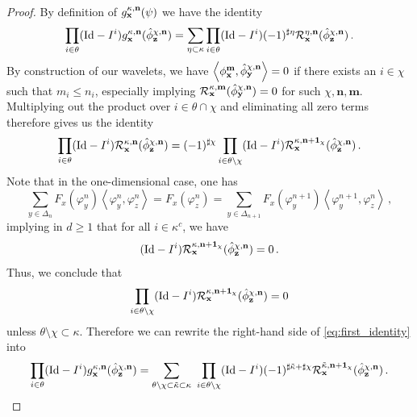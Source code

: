 \documentclass[12pt]{article}
\numberwithin{equation}{section}
\theoremstyle{plain}
\theoremstyle{definition}
\newcommand{\scalar}[1]{\left\langle #1 \right\rangle}
\newcommand{\Id}{\mbox{Id}}
\def\fm{\mathbf m}\def\fn{\mathbf n}\def\fN{\mathbf N}
\def\fy{\mathbf y}\def\fz{\mathbf z}
\def\fone{{\boldsymbol 1}}
\begin{document}
\begin{proof}
By definition of  $ g^{\kappa,\fn}_\fx(\psi) $ we have the identity
\begin{equation}\label{eq:first_identity}
\prod_{i\in\theta}(\Id-I^i)g_\fx^{\kappa,\fn}(\hat\phi^{\chi,\fn}_\fz)= \sum_{\eta\subset\kappa}\prod_{i\in\theta}(\Id-I^i)(-1)^{\sharp\eta}\mathcal{R}^{\eta,\fn}_\fx(\hat\phi^{\chi,\fn}_\fz)\,.
\end{equation}
By construction of our wavelets, we have $\scalar{\phi^\fm_\fx,\hat\phi_\fy^{\chi,\fn}} = 0$ if there exists an $i\in\chi$ such that $m_i\le n_i$, especially implying $\mathcal R_\fx^{\kappa,\fm}(\hat\phi_\fy^{\chi,\fn}) = 0$ for such $\chi,\fn,\fm$. Multiplying out the product over $i\in\theta\cap\chi$ and eliminating all zero terms therefore gives us the identity
\begin{equation*}
\prod_{i\in\theta}(\Id- I^i)\mathcal{R}_\fx^{\kappa,\fn}(\hat\phi_\fz^{\chi,\fn}) = (-1)^{\sharp\chi}\prod_{i\in\theta\setminus\chi}(\Id- I^i)\mathcal{R}^{\kappa,\fn+\fone_\chi}_\fx(\hat\phi^{\chi,\fn}_\fz)\,.
\end{equation*}
Note that in the one-dimensional case, one has
\[\sum_{y\in\Delta_n} F_x(\varphi^n_y)\scalar{\varphi^n_y,\varphi^n_z} = F_x(\varphi^n_z) = \sum_{y\in\Delta_{n+1}} F_x(\varphi^{n+1}_y)\scalar{\varphi^{n+1}_y,\varphi^n_z}\,,\] 
implying in $d\ge 1$ that for all $i\in\kappa^c$, we have
\begin{equation*}
(\Id- I^i)\mathcal{R}^{\kappa,\fn+\fone_\chi}_\fx(\hat\phi_\fz^{\chi,\fn}) = 0\,.
\end{equation*}
Thus, we conclude that
\begin{equation}\label{eq:ThetaXiSubsetKappa}
        \prod_{i\in\theta\setminus\chi}(\Id- I^i)\mathcal{R}^{\kappa,\fn+\fone_\chi}_\fx(\hat\phi_\fz^{\chi,\fn}) = 0
    \end{equation}
unless $\theta\setminus\chi\subset\kappa$. Therefore we can rewrite the right-hand side of \eqref{eq:first_identity} into     
\begin{equation}\label{eq:sumOverTildeKappa}
\prod_{i\in\theta}(\Id-I^i)g_\fx^{\kappa,\fn}(\hat\phi^{\chi,\fn}_\fz) = \sum_{\theta\setminus\chi\subset\tilde\kappa\subset\kappa}~\prod_{i\in\theta\setminus\chi}(\Id- I^i)(-1)^{\sharp{\tilde\kappa}+\sharp\chi}\mathcal{R}_\fx^{\tilde\kappa,\fn+\fone_\chi}(\hat\phi_\fz^{\chi,\fn})\,.
\end{equation}


\end{proof}
\end{document}
